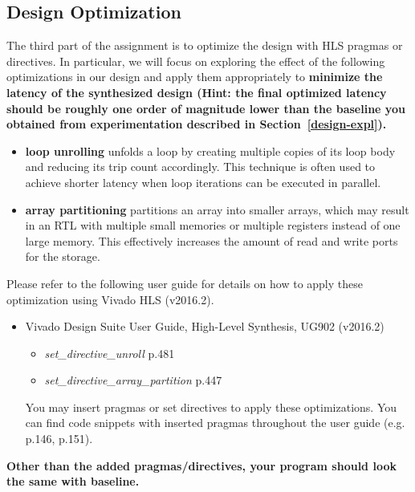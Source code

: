 \documentclass[paper=letter, fontsize=10pt]{scrartcl} %
\numberwithin{equation}{section} %
\numberwithin{figure}{section} %
\numberwithin{table}{section} %
\begin{document}
\subsection{Design Optimization}
\label{design-opt}
The third part of the assignment is to optimize the design with HLS pragmas or directives. In particular, we will focus on exploring the effect of the following optimizations in our design and apply them appropriately to \textbf{minimize the latency of the synthesized design (Hint: the final optimized latency should be roughly one order of magnitude lower than the baseline you obtained from experimentation described in Section~\ref{design-expl}).} 
\begin{itemize}
\item \textbf{loop unrolling} unfolds a loop by creating multiple copies of its loop body and reducing its trip count accordingly. This technique is often used to achieve shorter latency when loop iterations can be executed in parallel. 
\item \textbf{array partitioning} partitions an array into smaller arrays, which may result in an RTL with multiple small memories or multiple registers instead of one large memory. This effectively increases the amount of read and write ports for the storage.
\end{itemize}

Please refer to the following user guide for details on how to apply these optimization using Vivado HLS (v2016.2). 

\begin{itemize}
\item Vivado Design Suite User Guide, High-Level Synthesis, UG902 (v2016.2)~\cite{ug902}
\begin{itemize}
\item \textit{set\_directive\_unroll} p.481
\item \textit{set\_directive\_array\_partition} p.447
\end{itemize}
You may insert pragmas or set directives to apply these optimizations. You can find code snippets with inserted pragmas throughout the user guide (e.g. p.146, p.151).
\end{itemize}

\textbf{Other than the added pragmas/directives, your program should look the same with baseline.}
\end{document}
